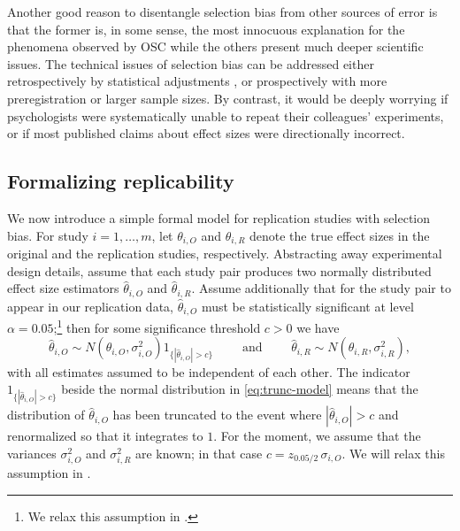 \documentclass[aoas, preprint]{imsart}
\theoremstyle{definition}
\theoremstyle{custom}
\newcommand{\htheta}{\hat{\theta}}
\begin{document}
  Another good reason to disentangle selection bias from other sources of error is that the former is, in some sense, the most innocuous explanation for the phenomena observed by OSC while the others present much deeper scientific issues. The technical issues of selection bias can be addressed either retrospectively by statistical adjustments \citep[e.g.][]{Duval:2000dg,Hedges:1992eb,Simonsohn:2014ch,Fithian:2014ws,Andrews:2018vh}, or prospectively with more preregistration or larger sample sizes. By contrast, it would be deeply worrying if psychologists were systematically unable to repeat their colleagues' experiments, or if most published claims about effect sizes were directionally incorrect.
  
\subsection{Formalizing replicability}

  We now introduce a simple formal model for replication studies with selection bias. For study $i=1, \ldots, m$, let $\theta_{i,O}$ and $\theta_{i,R}$ denote the true effect sizes in the original and the replication studies, respectively. Abstracting away experimental design details, assume that each study pair produces two normally distributed effect size estimators $\htheta_{i,O}$ and $\htheta_{i,R}$. Assume additionally that for the study pair to appear in our replication data, $\htheta_{i,O}$ must be statistically significant at level $\alpha=0.05$;\footnote{We relax this assumption in .} then for some significance threshold $c>0$ we have
  \begin{equation}
    \htheta_{i,O} \sim N\left(\theta_{i,O}, \sigma_{i,O}^2\right) 1_{\{|\htheta_{i,O}| > c\}} \qquad\text{ and }\qquad \htheta_{i,R} \sim N\left(\theta_{i,R}, \sigma_{i,R}^2\right),
  \label{eq:trunc-model}
  \end{equation}
  with all estimates assumed to be independent of each other. The indicator $1_{\{|\htheta_{i,O}| > c\}}$ beside the normal distribution in \eqref{eq:trunc-model} means that the distribution of $\htheta_{i,O}$ has been truncated to the event where $|\htheta_{i,O}|>c$ and renormalized so that it integrates to $1$. For the moment, we assume that the variances $\sigma_{i,O}^2$ and $\sigma_{i,R}^2$ are known; in that case $c = z_{0.05 / 2}\, \sigma_{i,O}$. We will relax this assumption in .
\end{document}
